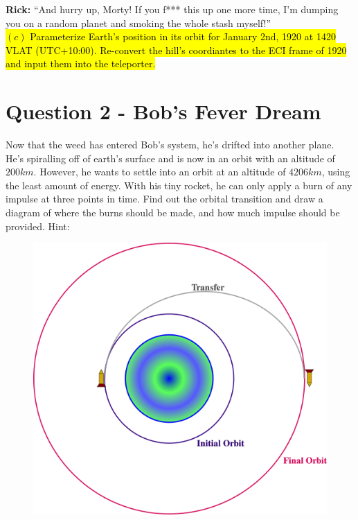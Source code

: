 \documentclass[a4paper, 12pt]{exam}
\begin{document}
\bigskip

\noindent \textbf{Rick:} “And hurry up, Morty! If you f*** this up one more time, I’m dumping you on a random planet and smoking the whole stash myself!” \\

\hl{$(c)$ Parameterize Earth's position in its orbit for January 2nd, 1920 at 1420 VLAT (UTC+10:00). Re-convert the hill's coordiantes to the ECI frame of 1920 and input them into the teleporter.}

	
	\pagebreak
	
	\section*{Question 2 - Bob's Fever Dream}
	Now that the weed has entered Bob's system, he's drifted into another plane. He's spiralling off of earth's surface and is now in an orbit with an altitude of $200km$. However, he wants to settle into an orbit at an altitude of $4206km$, using the least amount of energy. With his tiny rocket, he can only apply a burn of any impulse at three points in time. Find out the orbital transition and draw a diagram of where the burns should be made, and how much impulse should be provided. Hint:
	
	\begin{figure}[h!]
		\centering
		\includegraphics[scale = 0.8]{Q2_Transfer_Image.png}
	\end{figure}
	
\end{document}
